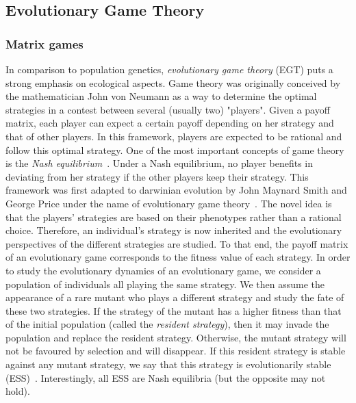 

    \subsection{Evolutionary Game Theory}

        \subsubsection{Matrix games}

            In comparison to population genetics, \emph{evolutionary game theory} (EGT) puts a strong emphasis on ecological aspects. Game theory was originally conceived by the mathematician John von Neumann as a way to determine the optimal strategies in a contest between several (usually two) "players". Given a payoff matrix, each player can expect a certain payoff depending on her strategy and that of other players. In this framework, players are expected to be rational and follow this optimal strategy. One of the most important concepts of game theory is the \emph{Nash equilibrium}~\parencite{Nash1950}. Under a Nash equilibrium, no player benefits in deviating from her strategy if the other players keep their strategy. This framework was first adapted to darwinian evolution by John Maynard Smith and George Price under the name of evolutionary game theory~\parencite{MaynardSmith1973}. The novel idea is that the players' strategies are based on their phenotypes rather than a rational choice. Therefore, an individual's strategy is now inherited and the evolutionary perspectives of the different strategies are studied. To that end, the payoff matrix of an evolutionary game corresponds to the fitness value of each strategy. In order to study the evolutionary dynamics of an evolutionary game, we consider a population of individuals all playing the same strategy. We then assume the appearance of a rare mutant who plays a different strategy and study the fate of these two strategies. If the strategy of the mutant has a higher fitness than that of the initial population (called the \emph{resident strategy}), then it may invade the population and replace the resident strategy. Otherwise, the mutant strategy will not be favoured by selection and will disappear. If this resident strategy is stable against any mutant strategy, we say that this strategy is evolutionarily stable (ESS)~\parencite{MaynardSmith1973}. Interestingly, all ESS are Nash equilibria (but the opposite may not hold).

